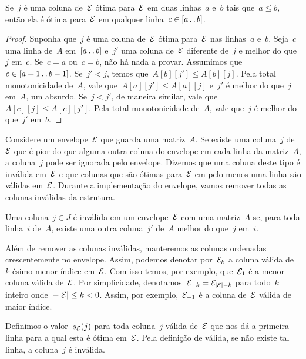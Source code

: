 \begin{lema} \label{Online:IntOpt}
Se~$j$ é uma coluna de~$\mathcal{E}$ ótima para~$\mathcal{E}$ em duas linhas~$a$ e~$b$ tais que~$a \leq b$, então ela é ótima para~$\mathcal{E}$ em qualquer linha~$c \in [a \,.\,.\, b]$.
\end{lema}

\begin{proof}
Suponha que~$j$ é uma coluna de~$\mathcal{E}$ ótima para~$\mathcal{E}$ nas linhas~$a$ e~$b$. Seja~$c$ uma linha de~$A$ em~$[a \,.\,.\, b]$ e~$j'$ uma coluna de~$\mathcal{E}$ diferente de~$j$ e melhor do que~$j$ em~$c$. Se~$c = a$ ou~$c = b$, não há nada a provar. Assumimos que~$c \in [a + 1 \,.\,.\, b - 1]$. Se~$j' < j$, temos que~$A[b][j'] \leq A[b][j]$. Pela total monotonicidade de~$A$, vale que~$A[a][j'] \leq A[a][j]$ e~$j'$ é melhor do que~$j$ em~$A$, um absurdo. Se~$j < j'$, de maneira similar, vale que~$A[c][j] \leq A[c][j']$. Pela total monotonicidade de~$A$, vale que~$j$ é melhor do que~$j'$ em~$b$.
\end{proof}

Considere um envelope~$\mathcal{E}$ que guarda uma matriz~$A$. Se existe uma coluna~$j$ de~$\mathcal{E}$ que é pior do que alguma outra coluna do envelope em cada linha da matriz~$A$, a coluna~$j$ pode ser ignorada pelo envelope. Dizemos que uma coluna deste tipo é inválida em~$\mathcal{E}$ e que colunas que são ótimas para~$\mathcal{E}$ em pelo menos uma linha são válidas em~$\mathcal{E}$. Durante a implementação do envelope, vamos remover todas as colunas inválidas da estrutura.

\begin{defi}
Uma coluna~${ j \in J }$ é inválida em um envelope~$\mathcal{E}$ com uma matriz~$A$ se, para toda linha~$i$ de~$A$, existe uma outra coluna~$j'$ de~$A$ melhor do que~$j$ em~$i$.
\end{defi}

Além de remover as colunas inválidas, manteremos as colunas ordenadas crescentemente no envelope. Assim, podemos denotar por~$\mathcal{E}_k$ a coluna válida de~$k$-ésimo menor índice em~$\mathcal{E}$. Com isso temos, por exemplo, que~$\mathcal{E}_1$ é a menor coluna válida de~$\mathcal{E}$. Por simplicidade, denotamos~$\mathcal{E}_{-k} = \mathcal{E}_{|\mathcal{E}|-k}$ para todo~$k$ inteiro onde~$-|\mathcal{E}| \leq k < 0$. Assim, por exemplo,~$\mathcal{E}_{-1}$ é a coluna de~$\mathcal{E}$ válida de maior índice.

Definimos o valor~$s_{\mathcal{E}}(j)$ para toda coluna~$j$ válida de~$\mathcal{E}$ que nos dá a primeira linha para a qual esta é ótima em~$\mathcal{E}$. Pela definição de válida, se não existe tal linha, a coluna~$j$ é inválida.

